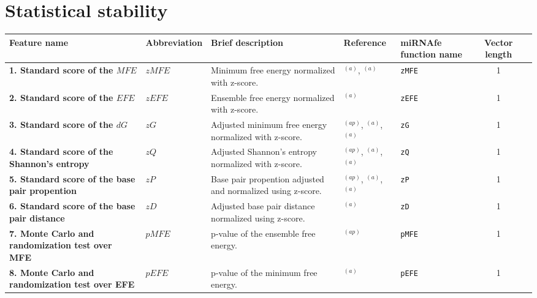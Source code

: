 \documentclass[a4paper,10pt]{article}
\begin{document}
\newpage






\section{Statistical stability}

\small
\begin{longtable}{ >{\raggedright\arraybackslash}p{4.2cm}  p{1.6cm}  p{5.6cm}  p{1.8cm}  l  cp{1cm} }
 \toprule
 Feature name & Abbreviation & \centering Brief description & Reference & miRNAfe function name  & Vector length \\
 \midrule
 \endhead
 \bottomrule
 \endlastfoot

\bfseries{1. Standard score of the $MFE$} & $zMFE$ & Minimum free energy normalized with z-score.
 & \cite{HS06}$^{(a)}$, \cite{GT07}$^{(a)}$ & \verb|zMFE| & 1 \\

\bfseries{2. Standard score of the $EFE$} & $zEFE$ & Ensemble free energy normalized with z-score. & \cite{JS10}$^{(a)}$ & \verb|zEFE| & 1 \\

\bfseries{3. Standard score of the $dG$} & $zG$ & Adjusted minimum free energy normalized with z-score. & \cite{KS07}$^{(ap)}$, \cite{RV09}$^{(a)}$, \cite{PM11}$^{(a)}$ & \verb|zG| & 1 \\

\bfseries{4. Standard score of the Shannon's entropy} & $zQ$ & Adjusted Shannon's entropy normalized with z-score. & \cite{KS07}$^{(ap)}$, \cite{RV09}$^{(a)}$, \cite{PM11}$^{(a)}$ & \verb|zQ| & 1 \\

\bfseries{5. Standard score of the base pair propention} & $zP$ & Base pair propention adjusted and normalized using z-score. & \cite{KS07}$^{(ap)}$, \cite{RV09}$^{(a)}$, \cite{PM11}$^{(a)}$ & \verb|zP| & 1 \\

\bfseries{6. Standard score of the base pair distance} & $zD$ & Adjusted base pair distance normalized using z-score. & \cite{JS10}$^{(a)}$ & \verb|zD| & 1 \\

\bfseries{7. Monte Carlo and randomization test over MFE} & $pMFE$ & p-value of the ensemble free energy. & \cite{BW04}$^{(ap)}$ & \verb|pMFE| & 1 \\

\bfseries{8. Monte Carlo and randomization test over EFE} & $pEFE$ & p-value of the minimum free energy.
& \cite{JS10}$^{(a)}$ & \verb|pEFE| & 1 \\

\end{longtable}
\end{document}
